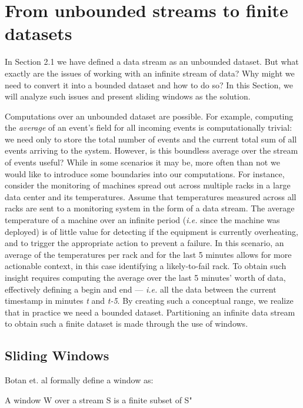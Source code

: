 \section{From unbounded streams to finite datasets} \label{sec:windows}

In Section 2.1 we have defined a data stream as an unbounded dataset. But what exactly are the issues of working with an infinite stream of data? Why might we need to convert it into a bounded dataset and how to do so? In this Section, we will analyze such issues and present sliding windows as the solution.

Computations over an unbounded dataset are possible. For example, computing the \textit{average} of an event's field for all incoming events is computationally trivial: we need only to store the total number of events and the current total sum of all events arriving to the system. However, is this boundless average over the stream of events useful? While in some scenarios it may be, more often than not we would like to introduce some boundaries into our computations. For instance, consider the monitoring of machines spread out across multiple racks in a large data center and its temperatures. Assume that temperatures measured across all racks are sent to a monitoring system in the form of a data stream. The average temperature of a machine over an infinite period (\textit{i.e.} since the machine was deployed) is of little value for detecting if the equipment is currently overheating, and to trigger the appropriate action to prevent a failure. In this scenario, an average of the temperatures per rack and for the last 5 minutes allows for more actionable context, in this case identifying a likely-to-fail rack. To obtain such insight requires computing the average over the last 5 minutes' worth of data, effectively defining a begin and end --- \textit{i.e.} all the data between the current timestamp in minutes \textit{t} and \textit{t-5}. By creating such a conceptual range, we realize that in practice we need a bounded dataset. Partitioning an infinite data stream to obtain such a finite dataset is made through the use of windows.

\subsection{Sliding Windows}

Botan et. al \cite{Botan-SECRET} formally define a window as:

\begin{definition}
A window W over a stream S is a finite subset of S"
\end{definition}

